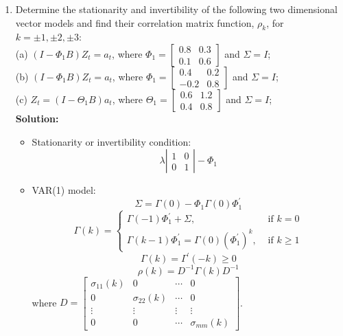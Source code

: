 \documentclass{article}
\begin{document}
\begin{enumerate}
	\item Determine the stationarity and invertibility of the following two dimensional vector models and find their correlation matrix function, $\rho_k$, for $k = \pm1, \pm2, \pm3$:\\
	(a) $\left(I-\Phi_{1} B\right) Z_{t}=a_{t}$, where $\Phi_{1}=\left[ \begin{array}{cc}{0.8} & {0.3} \\ {0.1} & {0.6}\end{array}\right]$ and $\Sigma= I$;\\
	(b) $\left(I-\Phi_{1} B\right) Z_{t}=a_{t}$, where $\Phi_{1}=\left[ \begin{array}{cc}{0.4} & {0.2} \\ {-0.2} & {0.8}\end{array}\right]$ and $\Sigma= I$;\\
	(c) $Z_{t}=\left(I-\Theta_{1} B\right) a_{t}$, where $\Theta_{1}=\left[ \begin{array}{ll}{0.6} & {1.2} \\ {0.4} & {0.8}\end{array}\right]$ and $\Sigma= I$;\\
	
	\textbf{Solution:}
	\begin{itemize}
		\item Stationarity or invertibility condition:
		\begin{equation*}
		\lambda \left| \begin{array}{cc} 1 & 0 \\ 0 & 1\end{array}\right| - \Phi_1
		\end{equation*}
		
		\item VAR(1) model:
		\begin{equation*}
		\Sigma=\Gamma(0)-\Phi_{1} \Gamma(0) \Phi_{1}^{\prime}
		\end{equation*}
		\begin{equation*}
		\Gamma(k)=\left\{\begin{array}{ll}{\Gamma(-1) \Phi_{1}^{\prime}+\Sigma,} & {\text { if } k=0} \\ {\Gamma(k-1) \Phi_{1}^{\prime}=\Gamma(0)\left(\Phi_{1}^{\prime}\right)^{k},} & {\text { if } k \geq 1}\end{array}\right.
		\end{equation*}
		\begin{equation*}
		\Gamma(k)=\Gamma^{\prime}(-k) \geq 0
		\end{equation*}
		\begin{equation*}
		\rho(k)=D^{-1} \Gamma(k) D^{-1}
		\end{equation*}
		where $D = \left[ \begin{array}{cccc}{\sigma_{11}(k)} & 0 & {\cdots} & 0 \\ 0 & {\sigma_{22}(k)} & {\cdots} & 0 \\ {\vdots} & {\vdots} & {\vdots} & {\vdots} \\ 0 & 0 & {\cdots} & {\sigma_{m m}(k)}\end{array}\right]$.
		

\end{itemize}
\end{enumerate}
\end{document}
